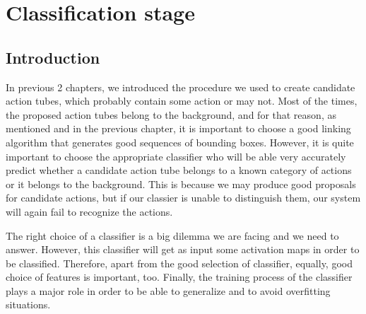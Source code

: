 



% 

\chapter{Classification stage}
\section{Introduction}
In previous 2 chapters, we introduced the procedure we used to create
candidate action tubes, which probably contain some action or may not.
Most of the times, the proposed action tubes belong to the background, and for that reason, as mentioned
and in the previous chapter, it is important to choose a good linking algorithm that generates good sequences of bounding
boxes. However, it is quite important to choose the appropriate classifier who will be able
very accurately predict whether a candidate action tube belongs to a known category of actions or
it belongs to the background. This is because we may produce good proposals for candidate actions, but if our classier
is unable to distinguish them, our system will again fail to recognize the actions. \par

The right choice of a classifier is a big dilemma we are facing and we need to answer. However, this classifier will get as input
some activation maps in order to be classified. Therefore, apart from the good selection of classifier, equally, 
good choice of features is important, too. Finally, the training process of the classifier plays a major role in order to 
be able to generalize and to avoid overfitting situations. \par

